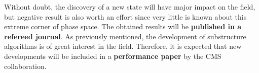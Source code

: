 \textcolor{\mynew}{
Without doubt, the discovery of a new state will have major impact on the field, but negative result is also worth an effort since very little is known about this extreme corner of phase space. The obtained results will be \textbf{published in a refereed journal}. As previously mentioned, the development of substructure algorithms is of great interest in the field. Therefore, it is expected that new developments will be included in a \textbf{performance paper} by the CMS collaboration.
}


